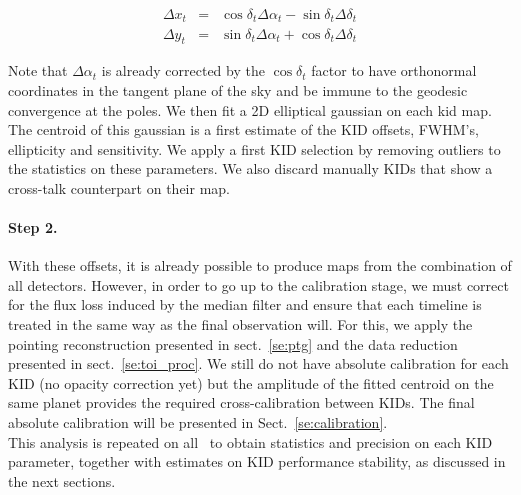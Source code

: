 \begin{eqnarray}
\Delta x_t &=& \cos\delta_t \Delta\alpha_t - \sin \delta_t\Delta \delta_t \nonumber \\
\Delta y_t &=& \sin\delta_t \Delta\alpha_t + \cos \delta_t\Delta \delta_t \nonumber
\end{eqnarray}

Note that $\Delta\alpha_t$ is already corrected by the $\cos\delta_t$ factor to
have orthonormal coordinates in the tangent plane of the sky and be immune to
the geodesic convergence at the poles. We then fit a 2D elliptical gaussian on
each kid map. The centroid of this gaussian is a first estimate of the KID
offsets, FWHM's, ellipticity and sensitivity. We apply a first KID selection by
removing outliers to the statistics on these parameters. We also discard
manually KIDs that show a cross-talk counterpart on their map.

\paragraph{Step 2.} With these offsets, it is already possible to produce maps
from the combination of all detectors. However, in order to go up to the
calibration stage, we must correct for the flux loss induced by the median
filter and ensure that each timeline is treated in the same way as the final
observation will. For this, we apply the pointing reconstruction
presented in sect.~\ref{se:ptg} and the data reduction presented in
sect.~\ref{se:toi_proc}. We still do not have absolute calibration for each KID
(no opacity correction yet) but the amplitude of the fitted centroid on the same
planet provides the required cross-calibration between KIDs. The final absolute
calibration will be presented in Sect.~\ref{se:calibration}.\\

This analysis is repeated on all \bms\ to obtain statistics and
precision on each KID parameter, together with estimates on KID performance
stability, as discussed in the next sections.


